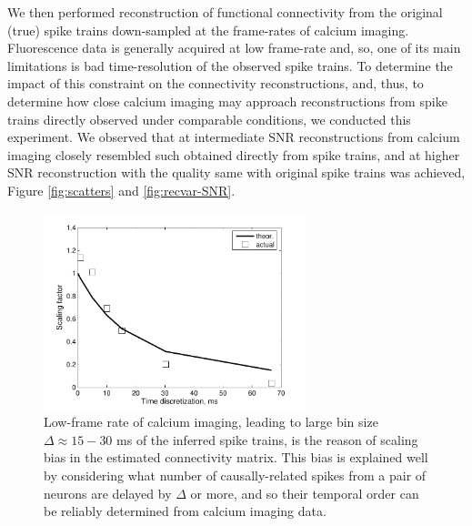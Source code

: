 We then performed reconstruction of functional connectivity from the original (true) spike trains down-sampled at the frame-rates of calcium imaging.
Fluorescence data is generally acquired at low frame-rate and, so, one of its main limitations is bad time-resolution of the observed spike trains. To determine the impact of this constraint on the connectivity reconstructions, and, thus, to determine how close calcium imaging may approach  reconstructions from spike trains directly observed under comparable conditions, we conducted this experiment.
We observed that at intermediate SNR reconstructions from calcium imaging closely resembled such obtained directly from spike trains, and at higher SNR reconstruction with the quality same with original spike trains was achieved, Figure \ref{fig:scatters} and \ref{fig:recvar-SNR}.

\begin{figure}[h]
\centering
\includegraphics[width=3in]{../figs/FigureA4_scale_bias}
\caption{Low-frame rate of calcium imaging, leading to large bin size $\Delta\approx 15-30$ ms of the inferred spike trains, is the reason of scaling bias in the estimated connectivity matrix.
This bias is explained well by considering what number of causally-related spikes from
a pair of neurons are delayed by $\Delta$ or more, and so their temporal order can be reliably determined from calcium imaging data.}
\label{fig:bias}
\end{figure}

